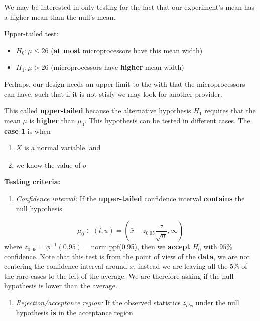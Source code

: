 \documentclass[
]{book}
\providecommand{\tightlist}{%
  \setlength{\itemsep}{0pt}\setlength{\parskip}{0pt}}
\begin{document}
We may be interested in only testing for the fact that our experiment's mean has a higher mean than the null's mean.

Upper-tailed test:

\begin{itemize}
\tightlist
\item
  \(H_0:\mu \leq 26\) (\textbf{at most} microprocessors have this mean width)
\item
  \(H_1:\mu > 26\) (microprocessors have \textbf{higher} mean width)
\end{itemize}

Perhaps, our design needs an upper limit to the with that the microprocessors can have, such that if it is not stisfy we may look for another provider.

This called \textbf{upper-tailed} because the alternative hypothesis \(H_1\) requires that the mean \(\mu\) is \textbf{higher} than \(\mu_0\). This hypothesis can be tested in different cases. The \textbf{case 1} is when

\begin{enumerate}
\def\labelenumi{\arabic{enumi}.}
\tightlist
\item
  \(X\) is a normal variable, and
\item
  we know the value of \(\sigma\)
\end{enumerate}

\textbf{Testing criteria:}

\begin{enumerate}
\def\labelenumi{\arabic{enumi}.}
\tightlist
\item
  \emph{Confidence interval:} If the \textbf{upper-tailed} confidence interval \textbf{contains} the null hypothesis
\end{enumerate}

\[\mu_0\in (l,u)=(\bar{x}-z_{0.05} \frac{\sigma}{\sqrt{n}}, \infty)\]
where \(z_{0.05}=\phi^{-1}(0.95)=\)norm.ppf(0.95), then we \textbf{accept} \(H_0\) with \(95\%\) confidence. Note that this test is from the point of view of the \textbf{data}, we are not centering the confidence interval around \(\bar{x}\), instead we are leaving all the \(5\%\) of the rare cases to the left of the average. We are therefore asking if the null hypothesis is lower than the average.

\begin{enumerate}
\def\labelenumi{\arabic{enumi}.}
\setcounter{enumi}{1}
\tightlist
\item
  \emph{Rejection/acceptance region:} If the observed statistics \(z_{obs}\) under the null hypothesis \textbf{is} in the acceptance region
\end{enumerate}
\end{document}
